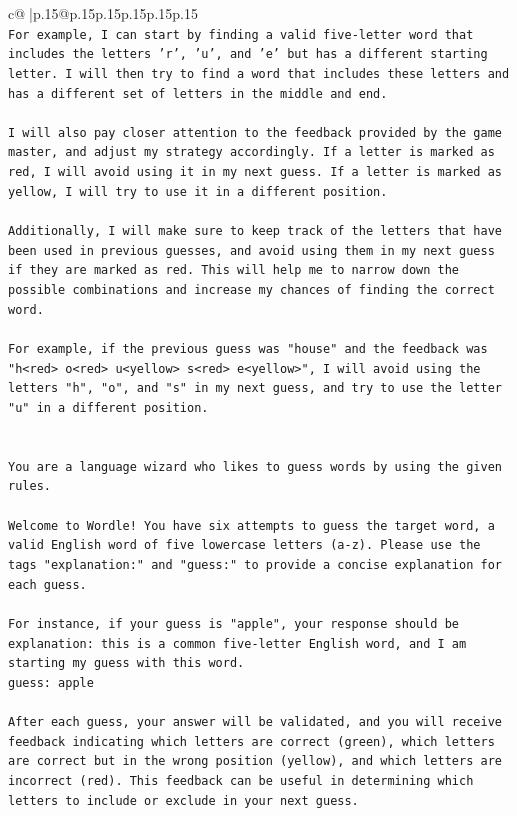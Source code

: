 \documentclass{article}
\begin{document}
{\begin{supertabular}{c@{$\;$}|p{.15\linewidth}@{}p{.15\linewidth}p{.15\linewidth}p{.15\linewidth}p{.15\linewidth}p{.15\linewidth}}
{{{\\ 
\texttt{For example, I can start by finding a valid five{-}letter word that includes the letters 'r', 'u', and 'e' but has a different starting letter. I will then try to find a word that includes these letters and has a different set of letters in the middle and end. } \\
\\ 
\texttt{I will also pay closer attention to the feedback provided by the game master, and adjust my strategy accordingly. If a letter is marked as red, I will avoid using it in my next guess. If a letter is marked as yellow, I will try to use it in a different position. } \\
\\ 
\texttt{Additionally, I will make sure to keep track of the letters that have been used in previous guesses, and avoid using them in my next guess if they are marked as red. This will help me to narrow down the possible combinations and increase my chances of finding the correct word. } \\
\\ 
\texttt{For example, if the previous guess was "house" and the feedback was "h<red> o<red> u<yellow> s<red> e<yellow>", I will avoid using the letters "h", "o", and "s" in my next guess, and try to use the letter "u" in a different position.} \\
\\ 
\\ 
\texttt{You are a language wizard who likes to guess words by using the given rules.} \\
\\ 
\texttt{Welcome to Wordle! You have six attempts to guess the target word, a valid English word of five lowercase letters (a{-}z). Please use the tags "explanation:" and "guess:" to provide a concise explanation for each guess.} \\
\\ 
\texttt{For instance, if your guess is "apple", your response should be} \\
\texttt{explanation: this is a common five{-}letter English word, and I am starting my guess with this word.} \\
\texttt{guess: apple} \\
\\ 
\texttt{After each guess, your answer will be validated, and you will receive feedback indicating which letters are correct (green), which letters are correct but in the wrong position (yellow), and which letters are incorrect (red). This feedback can be useful in determining which letters to include or exclude in your next guess.} \\
}}}
\end{supertabular}}
\end{document}
